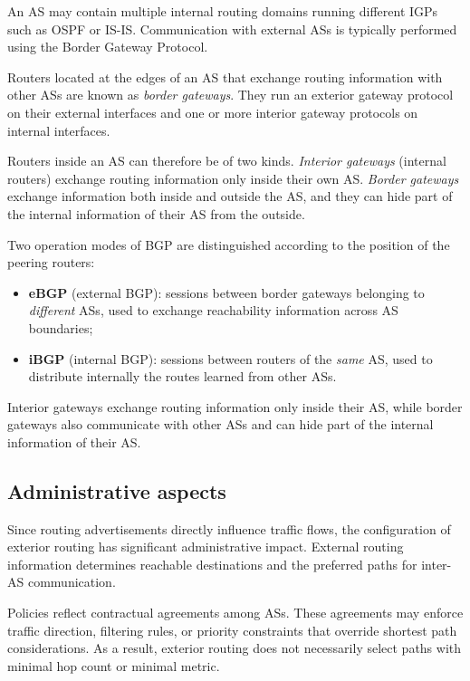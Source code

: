 An AS may contain multiple internal routing domains running different IGPs such as OSPF or IS-IS. Communication with external ASs is typically performed using the Border Gateway Protocol. 

Routers located at the edges of an AS that exchange routing information with other ASs are known as \emph{border gateways}. They run an exterior gateway protocol on their external interfaces and one or more interior gateway protocols on internal interfaces.

Routers inside an AS can therefore be of two kinds. \emph{Interior gateways}
(internal routers) exchange routing information only inside their own AS.
\emph{Border gateways} exchange information both inside and outside the AS, and
they can hide part of the internal information of their AS from the outside.

Two operation modes of BGP are distinguished according to the position of the peering routers:
\begin{itemize}
	\item \textbf{eBGP} (external BGP): sessions between border gateways belonging to
	\emph{different} ASs, used to exchange reachability information across AS boundaries;
	\item \textbf{iBGP} (internal BGP): sessions between routers of the \emph{same} AS, used to
	distribute internally the routes learned from other ASs.
\end{itemize}

\begin{center}
\end{center}

Interior gateways exchange routing information only inside their AS, while border gateways
also communicate with other ASs and can hide part of the internal information of their AS.

\subsection{Administrative aspects}

Since routing advertisements directly influence traffic flows, the configuration of exterior routing has significant administrative impact. External routing information determines reachable destinations and the preferred paths for inter-AS communication.

Policies reflect contractual agreements among ASs. These agreements may enforce traffic direction, filtering rules, or priority constraints that override shortest path considerations. As a result, exterior routing does not necessarily select paths with minimal hop count or minimal metric.

